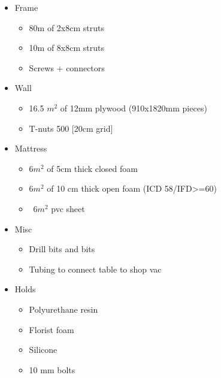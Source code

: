 \documentclass{scrartcl}
\begin{document}
\begin{itemize}
\item Frame
\begin{itemize}
\item 80m of 2x8cm struts 
\item 10m of 8x8cm struts
\item Screws + connectors
\end{itemize}
\item Wall
\begin{itemize}
\item 16.5 $m^2$ of 12mm plywood (910x1820mm pieces)
\item T-nuts 500 [20cm grid]
\end{itemize}
\item Mattress
\begin{itemize}
\item 6$m^2$ of 5cm thick closed foam
\item 6$m^2$ of 10 cm thick open foam (ICD 58/IFD>=60)
\item ~6$m^2$ pvc sheet
\end{itemize}
\item Misc
\begin{itemize}
\item Drill bits and bits
\item Tubing to connect table to shop vac
\end{itemize}
\item Holds
\begin{itemize}
\item Polyurethane resin
\item Florist foam
\item Silicone 
\item 10 mm bolts
\end{itemize}
\end{itemize}
\end{document}
